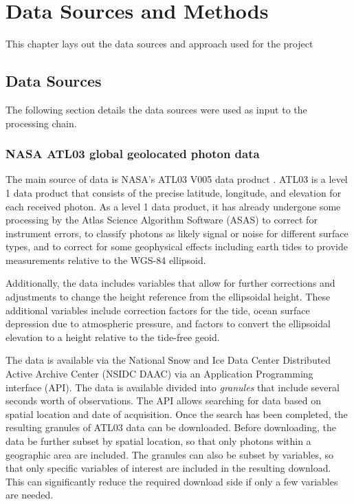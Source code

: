 \chapter{Data Sources and Methods}\label{sec:methodology}
This chapter lays out the data sources and approach used for the project
\section{Data Sources}

The following section details the data sources were used as input to the processing chain.

\subsection{NASA ATL03 global geolocated photon data}

The main source of data is NASA's ATL03 V005 data product \parencite{icesat2data}. ATL03 is a level 1 data product that consists of the precise latitude, longitude, and elevation for each received photon. As a level 1 data product, it has already undergone some processing by the Atlas Science Algorithm Software (ASAS) to correct for instrument errors, to classify photons as likely signal or noise for different surface types, and to correct for some geophysical effects including earth tides to provide measurements relative to the WGS-84 ellipsoid. 

Additionally, the data includes variables that allow for further corrections and adjustments to change the height reference from the ellipsoidal height. These additional variables include correction factors for the tide, ocean surface depression due to atmospheric pressure, and factors to convert the ellipsoidal elevation to a height relative to the tide-free geoid.

The data is available via the National Snow and Ice Data Center Distributed Active Archive Center (NSIDC DAAC) via an Application Programming interface (API). The data is available divided into \emph{granules} that include several seconds worth of observations. The API allows searching for data based on spatial location and date of acquisition. Once the search has been completed, the resulting granules of ATL03 data can be downloaded. Before downloading, the data be further subset by spatial location, so that only photons within a geographic area are included. The granules can also be subset by variables, so that only specific variables of interest are included in the resulting download. This can significantly reduce the required download side if only a few variables are needed.



